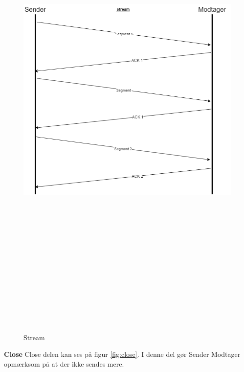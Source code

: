 \begin{figure}[ht]
	\centering
	\includegraphics[width=15cm,height=25cm,keepaspectratio]{pictures/Stream.png}
	\caption{Stream}
	\label{fig:stream}
\end{figure}

\hfill \break
\hfill \break
\textbf{Close}
\newline
Close delen kan ses på figur \ref{fig:close}.
\newline
I denne del gør Sender Modtager opmærksom på at der ikke sendes mere.

